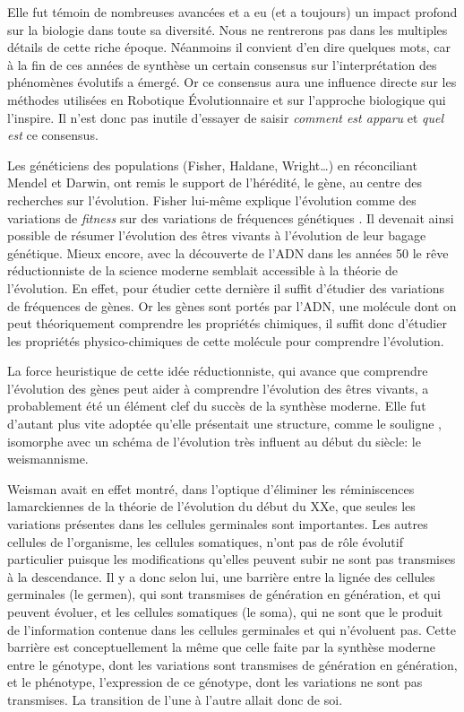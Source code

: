 Elle fut témoin de nombreuses avancées et a eu (et a toujours) un impact profond sur la biologie dans toute sa diversité. Nous ne rentrerons pas dans les multiples détails de cette riche époque. Néanmoins il convient d'en dire quelques mots, car à la fin de ces années de synthèse un certain consensus sur l'interprétation des phénomènes évolutifs a émergé. Or ce consensus aura une influence directe sur les méthodes utilisées en Robotique \'Evolutionnaire et sur l'approche biologique qui l'inspire. Il n'est donc pas inutile d'essayer de saisir \emph{comment est apparu} et \emph{quel est} ce consensus.

Les généticiens des populations (Fisher, Haldane, Wright\ldots) en réconciliant Mendel et Darwin, ont remis le support de l'hérédité, le gène, au centre des recherches sur l'évolution. Fisher lui-même explique l'évolution comme des variations de \emph{fitness} sur des variations de fréquences génétiques \citep{fisher1930geneticaltheorynaturalselection}.
Il devenait ainsi possible de résumer l'évolution des êtres vivants à l'évolution de leur bagage génétique. Mieux encore, avec la découverte de l'ADN dans les années 50 le rêve réductionniste de la science moderne semblait accessible à la théorie de l'évolution. En effet, pour étudier cette dernière il suffit d'étudier des variations de fréquences de gènes. Or les gènes sont portés par l'ADN, une molécule dont on peut théoriquement comprendre les propriétés chimiques, il suffit donc d'étudier les propriétés physico-chimiques de cette molécule pour comprendre l'évolution.

La force heuristique de cette idée réductionniste, qui avance que comprendre l'évolution des gènes peut aider à comprendre l'évolution des êtres vivants, a probablement été un élément clef du succès de la synthèse moderne. Elle fut d'autant plus vite adoptée qu'elle présentait une structure, comme le souligne \cite{griesemer2002whatisepiaboutepigenetics}, isomorphe avec un schéma de l'évolution très influent au début du siècle: le weismannisme. 

Weisman avait en effet montré, dans l'optique d'éliminer les réminiscences lamarckiennes de la théorie de l'évolution du début du XXe, que seules les variations présentes dans les cellules germinales sont importantes. Les autres cellules de l'organisme, les cellules somatiques, n'ont pas de rôle évolutif particulier puisque les modifications qu'elles peuvent subir ne sont pas transmises à la descendance. Il y a donc selon lui, une barrière entre la lignée des cellules germinales (le germen), qui sont transmises de génération en génération, et qui peuvent évoluer, et les cellules somatiques (le soma), qui ne sont que le produit de l'information contenue dans les cellules germinales et qui n'évoluent pas. Cette barrière est conceptuellement la même que celle faite par la synthèse moderne entre le génotype, dont les variations sont transmises de génération en génération, et le phénotype, l'expression de ce génotype, dont les variations ne sont pas transmises. La transition de l'une à l'autre allait donc de soi.

